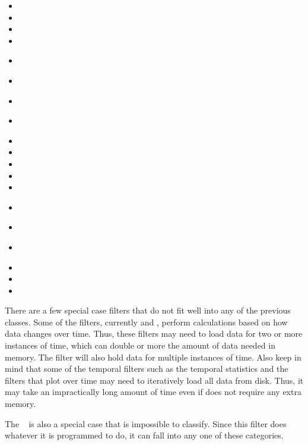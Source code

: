 \begin{multicols}{2}
  \begin{itemize}
  \item {}
  \item {}
  \item {}
  \item {}
  \item {}~\extractGroup
  \item {}~\glyph
  \item {}~\group
  \item {}~
  \item {}
  \item {}
  \item {}
  \item {}
  \item {}
  \item {}~
  \item {}~
  \item {}~
  \item {}
  \item {}
  \item {}
  \end{itemize}
\end{multicols}

There are a few special case filters that do not fit well into any of the
previous classes.  Some of the filters, currently  and , perform calculations based on
how data changes over time.  Thus, these filters may need to load data for
two or more instances of time, which can double or more the amount of data
needed in memory.  The  filter will also hold data for
multiple instances of time.  Also keep in mind that some of the temporal
filters such as the temporal statistics and the filters that plot over time
may need to iteratively load all data from disk.  Thus, it may take an
impractically long amount of time even if does not require any extra
memory.

The ~ is also a
special case that is impossible to classify.  Since this filter does
whatever it is programmed to do, it can fall into any one of these
categories.

